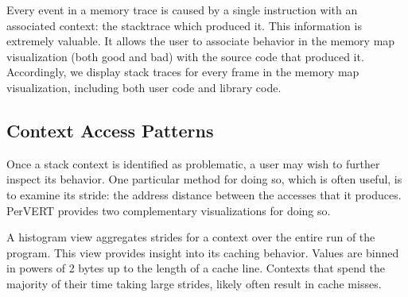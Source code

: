 \documentclass[annual]{acmsiggraph}
\begin{document}
    Every event in a memory trace is caused by a single instruction with an associated context: the stacktrace which produced it.
    This information is extremely valuable.
    It allows the user to associate behavior in the memory map visualization (both good and bad) 
      with the source code that produced it.
    Accordingly, we display stack traces for every frame in the memory map visualization, 
      including both user code and library code.
  
  \subsection{Context Access Patterns}

    Once a stack context is identified as problematic, a user may wish to further inspect its behavior.
    One particular method for doing so, which is often useful, is to examine its stride:
      the address distance between the accesses that it produces.
    PerVERT provides two complementary visualizations for doing so.

    A histogram view aggregates strides for a context over the entire run of the program.
    This view provides insight into its caching behavior.
    Values are binned in powers of 2 bytes up to the length of a cache line.
    Contexts that spend the majority of their time taking large strides, likely often result in cache misses.
    
\end{document}
